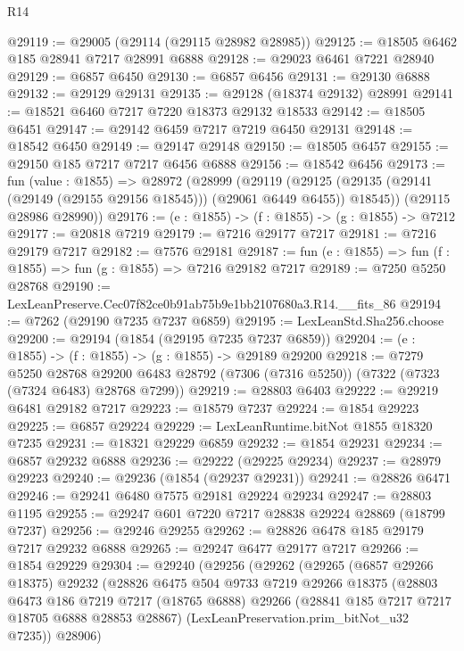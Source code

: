 \begin{lexlean}{R14}
\begin{coremodule}
@29119 := @29005 (@29114 (@29115 @28982 @28985))
@29125 := @18505 @6462 @185 @28941 @7217 @28991 @6888
@29128 := @29023 @6461 @7221 @28940
@29129 := @6857 @6450
@29130 := @6857 @6456
@29131 := @29130 @6888
@29132 := @29129 @29131
@29135 := @29128 (@18374 @29132) @28991
@29141 := @18521 @6460 @7217 @7220 @18373 @29132 @18533
@29142 := @18505 @6451
@29147 := @29142 @6459 @7217 @7219 @6450 @29131
@29148 := @18542 @6450
@29149 := @29147 @29148
@29150 := @18505 @6457
@29155 := @29150 @185 @7217 @7217 @6456 @6888
@29156 := @18542 @6456
@29173 := fun (value : @1855) =>
  @28972
    (@28999
      (@29119
        (@29125 (@29135 (@29141 (@29149 (@29155 @29156 @18545))) (@29061 @6449 @6455)) @18545))
      (@29115 @28986 @28990))
@29176 := (e : @1855) -> (f : @1855) -> (g : @1855) -> @7212
@29177 := @20818 @7219
@29179 := @7216 @29177 @7217
@29181 := @7216 @29179 @7217
@29182 := @7576 @29181
@29187 := fun (e : @1855) => fun (f : @1855) => fun (g : @1855) => @7216 @29182 @7217
@29189 := @7250 @5250 @28768
@29190 := LexLeanPreserve.Cec07f82ce0b91ab75b9e1bb2107680a3.R14.__fits_86
@29194 := @7262 (@29190 @7235 @7237 @6859)
@29195 := LexLeanStd.Sha256.choose
@29200 := @29194 (@1854 (@29195 @7235 @7237 @6859))
@29204 := (e : @1855) -> (f : @1855) -> (g : @1855) -> @29189 @29200
@29218 := @7279
    @5250
    @28768
    @29200
    @6483
    @28792
    (@7306 (@7316 @5250))
    (@7322 (@7323 (@7324 @6483) @28768 @7299))
@29219 := @28803 @6403
@29222 := @29219 @6481 @29182 @7217
@29223 := @18579 @7237
@29224 := @1854 @29223
@29225 := @6857 @29224
@29229 := LexLeanRuntime.bitNot @1855 @18320 @7235
@29231 := @18321 @29229 @6859
@29232 := @1854 @29231
@29234 := @6857 @29232 @6888
@29236 := @29222 (@29225 @29234)
@29237 := @28979 @29223
@29240 := @29236 (@1854 (@29237 @29231))
@29241 := @28826 @6471
@29246 := @29241 @6480 @7575 @29181 @29224 @29234
@29247 := @28803 @1195
@29255 := @29247 @601 @7220 @7217 @28838 @29224 @28869 (@18799 @7237)
@29256 := @29246 @29255
@29262 := @28826 @6478 @185 @29179 @7217 @29232 @6888
@29265 := @29247 @6477 @29177 @7217
@29266 := @1854 @29229
@29304 := @29240
    (@29256
      (@29262
        (@29265
          (@6857 @29266 @18375)
          @29232
          (@28826
            @6475
            @504
            @9733
            @7219
            @29266
            @18375
            (@28803
              @6473
              @186
              @7219
              @7217
              (@18765 @6888)
              @29266
              (@28841 @185 @7217 @7217 @18705 @6888 @28853 @28867)
              (LexLeanPreservation.prim_bitNot_u32 @7235))
            @28906)

\end{coremodule}
\end{lexlean}
